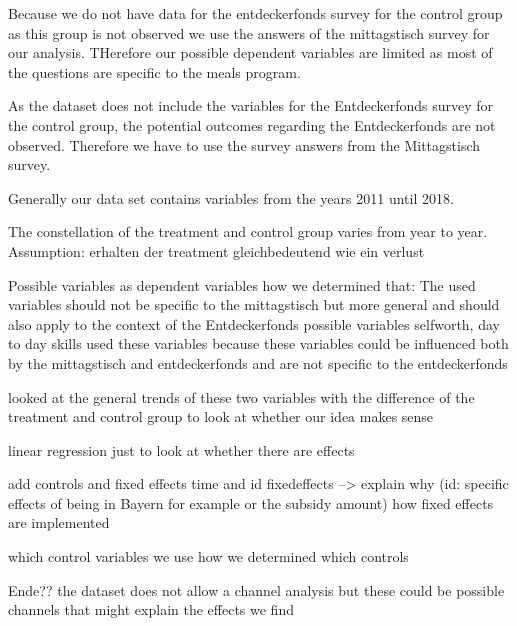 \documentclass[12pt, a4paper, titlepage]{article}\usepackage[]{graphicx}\usepackage[]{color}
\begin{document}
Because we do not have data for the entdeckerfonds survey for the control group as this group is not observed we use the answers of the mittagstisch survey for our analysis. THerefore our possible dependent variables are limited as most of the questions are specific to the meals program. 

As the dataset does not include the variables for the Entdeckerfonds survey for the control group, the potential outcomes regarding the Entdeckerfonds are not observed. Therefore we have to use the survey answers from the Mittagstisch survey.

Generally our data set contains variables from the years 2011 until 2018. 

The constellation of the treatment and control group varies from year to year. 
Assumption: erhalten der treatment gleichbedeutend wie ein verlust

Possible variables as dependent variables
how we determined that:
The used variables should not be specific to the mittagstisch but more general and should also apply to the context of the Entdeckerfonds
possible variables selfworth, day to day skills
used these variables because these variables could be influenced both by the mittagstisch and entdeckerfonds and are not specific to the entdeckerfonds

looked at the general trends of these two variables with the difference of the treatment and control group to look at whether our idea makes sense

linear regression just to look at whether there are effects

add controls and fixed effects time and id fixedeffects --> explain why (id: specific effects of being in Bayern for example or the subsidy amount)
how fixed effects are implemented

which control variables we use
how we determined which controls





Ende??
the dataset does not allow a channel analysis but these could be possible channels that might explain the effects we find
\end{document}
